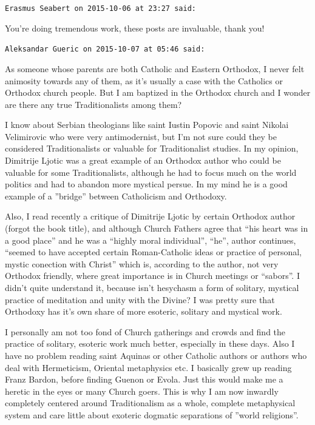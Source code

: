 \begin{footnotesize}
\begin{sffamily}
\texttt{Erasmus Seabert on 2015-10-06 at 23:27 said:}

You're doing tremendous work, these posts are invaluable, thank you!

\hfill

\texttt{Aleksandar Gueric on 2015-10-07 at 05:46 said:}

As someone whose parents are both Catholic and Eastern Orthodox, I never felt animosity towards any of them, as it's usually a case with the Catholics or Orthodox church people. But I am baptized in the Orthodox church and I wonder are there any true Traditionalists among them?

I know about Serbian theologians like saint Iustin Popovic and saint Nikolai Velimirovic who were very antimodernist, but I'm not sure could they be considered Traditionalists or valuable for Traditionalist studies. In my opinion, Dimitrije Ljotic was a great example of an Orthodox author who could be valuable for some Traditionalists, although he had to focus much on the world politics and had to abandon more mystical persue. In my mind he is a good example of a ''bridge'' between Catholicism and Orthodoxy.

Also, I read recently a critique of Dimitrije Ljotic by certain Orthodox author (forgot the book title), and although Church Fathers agree that ``his heart was in a good place'' and he was a ``highly moral individual'', ``he'', author continues, ``seemed to have accepted certain Roman-Catholic ideas or practice of personal, mystic conection with Christ'' which is, according to the author, not very Orthodox friendly, where great importance is in Church meetings or ``sabors''. I didn't quite understand it, because isn't hesychasm a form of solitary, mystical practice of meditation and unity with the Divine? I was pretty sure that Orthodoxy has it's own share of more esoteric, solitary and mystical work.

I personally am not too fond of Church gatherings and crowds and find the practice of solitary, esoteric work much better, especially in these days. Also I have no problem reading saint Aquinas or other Catholic authors or authors who deal with Hermeticism, Oriental metaphysics etc. I basically grew up reading Franz Bardon, before finding Guenon or Evola. Just this would make me a heretic in the eyes or many Church goers. This is why I am now inwardly completely centered around Traditionalism as a whole, complete metaphysical system and care little about exoteric dogmatic separations of ''world religions''.


\end{sffamily}
\end{footnotesize}
